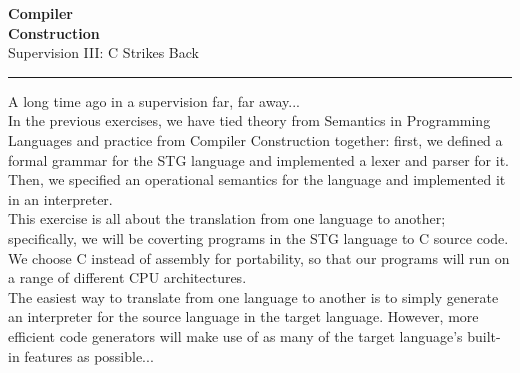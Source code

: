 \documentclass[10pt,a4paper]{exam} %
\begin{document}
\newcommand{\course}{Compiler\\[-0.4cm]Construction}
\newcommand{\week}{III}

\everymath{\color{campurpledark}}
\everydisplay{\color{campurpledark}}




\marksnotpoints
\pointsdroppedatright
\marksnotpoints
\marginpointname{ \points}

\begin{center}
\LARGE {\textbf{\color{campurpledark} \course} }\\[-0.2cm]
\Large \color{campurpledark} Supervision \week: C Strikes Back\\
\end{center}

{\color{campurple}\hrule}

\newcommand{\metavar}[1]{{\color{campurple}#1}}

\vspace{0.5cm}

\newcommand{\terminal}[1]{\texttt{\color{campurple}#1}}
\newcommand{\bl}[1]{{\color{black}#1}}


\begin{center}
\parbox[c]{340pt}{
A long time ago in a supervision far, far away... \\

In the previous exercises, we have tied theory from Semantics in Programming Languages and practice from Compiler Construction together: first, we defined a formal grammar for the STG language and implemented a lexer and parser for it. Then, we specified an operational semantics for the language and implemented it in an interpreter. \\

This exercise is all about the translation from one language to another; specifically, we will be coverting programs in the STG language to C source code. We choose C instead of assembly for portability, so that our programs will run on a range of different CPU architectures. \\

The easiest way to translate from one language to another is to simply generate an interpreter for the source language in the target language. However, more efficient code generators will make use of as many of the target language's built-in features as possible...
}
\end{center}
\end{document}
